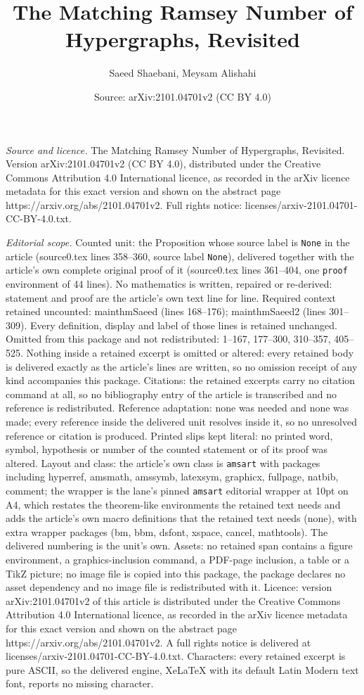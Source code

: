 \documentclass[10pt,a4paper]{amsart}
\title[The Matching Ramsey Number of Hypergraphs, Revisited]{The Matching Ramsey Number of Hypergraphs, Revisited}
\author{Saeed Shaebani, Meysam Alishahi}
\date{Source: arXiv:2101.04701v2 (CC BY 4.0)}
\begin{document}
\maketitle

\noindent\emph{Source and licence.} The Matching Ramsey Number of Hypergraphs, Revisited. Version arXiv:2101.04701v2 (CC BY 4.0), distributed under the Creative Commons Attribution 4.0 International licence, as recorded in the arXiv licence metadata for this exact version and shown on the abstract page https://arxiv.org/abs/2101.04701v2. Full rights notice: licenses/arxiv-2101.04701-CC-BY-4.0.txt.\par\smallskip

\noindent\textit{Editorial scope.} Counted unit: the Proposition whose source label is \texttt{None} in the article (source0.tex lines 358--360, source label \texttt{None}), delivered together with the article's own complete original proof of it (source0.tex lines 361--404, one \texttt{proof} environment of 44 lines). No mathematics is written, repaired or re-derived: statement and proof are the article's own text line for line. Required context retained uncounted: mainthmSaeed (lines 168--176); mainthmSaeed2 (lines 301--309). Every definition, display and label of those lines is retained unchanged. Omitted from this package and not redistributed: 1--167, 177--300, 310--357, 405--525. Nothing inside a retained excerpt is omitted or altered: every retained body is delivered exactly as the article's lines are written, so no omission receipt of any kind accompanies this package. Citations: the retained excerpts carry no citation command at all, so no bibliography entry of the article is transcribed and no reference is redistributed. Reference adaptation: none was needed and none was made; every reference inside the delivered unit resolves inside it, so no unresolved reference or citation is produced. Printed slips kept literal: no printed word, symbol, hypothesis or number of the counted statement or of its proof was altered. Layout and class: the article's own class is \texttt{amsart} with packages including hyperref, amsmath, amssymb, latexsym, graphicx, fullpage, natbib, comment; the wrapper is the lane's pinned \texttt{amsart} editorial wrapper at 10pt on A4, which restates the theorem-like environments the retained text needs and adds the article's own macro definitions that the retained text needs (none), with extra wrapper packages (bm, bbm, dsfont, xspace, cancel, mathtools). The delivered numbering is the unit's own. Assets: no retained span contains a figure environment, a graphics-inclusion command, a PDF-page inclusion, a table or a TikZ picture; no image file is copied into this package, the package declares no asset dependency and no image file is redistributed with it. Licence: version arXiv:2101.04701v2 of this article is distributed under the Creative Commons Attribution 4.0 International licence, as recorded in the arXiv licence metadata for this exact version and shown on the abstract page https://arxiv.org/abs/2101.04701v2. A full rights notice is delivered at licenses/arxiv-2101.04701-CC-BY-4.0.txt. Characters: every retained excerpt is pure ASCII, so the delivered engine, XeLaTeX with its default Latin Modern text font, reports no missing character.
\end{document}
